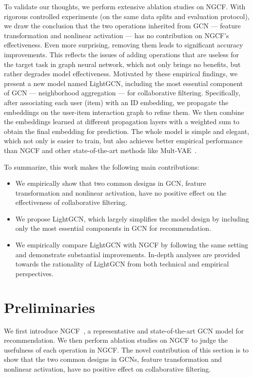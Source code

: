 \documentclass[sigconf]{acmart}
\theoremstyle{definition}
\begin{document}
To validate our thoughts, we perform extensive ablation studies on NGCF. With rigorous controlled experiments (on the same data splits and evaluation protocol), we draw the conclusion that the two operations inherited from GCN --- feature transformation and nonlinear activation --- has no contribution on NGCF's effectiveness. Even more surprising, removing them leads to significant accuracy improvements. This reflects the issues of adding operations that are useless for the target task in graph neural network, which not only brings no benefits, but rather degrades model effectiveness. Motivated by these empirical findings, we present a new model named LightGCN, including the most essential component of GCN --- neighborhood aggregation --- for collaborative filtering. Specifically, after associating each user (item) with an ID embedding, we propagate the embeddings on the user-item interaction graph to refine them. We then combine the embeddings learned at different propagation layers with a weighted sum to obtain the final embedding for prediction. The whole model is simple and elegant, which not only is easier to train, but also achieves better empirical performance than NGCF and other state-of-the-art methods like Mult-VAE~\cite{VACF}. 

To summarize, this work makes the following main contributions:
\begin{itemize}\item We empirically show that two common designs in GCN, feature transformation and nonlinear activation, have no positive effect on the effectiveness of collaborative filtering. 
    \item We propose LightGCN, which largely simplifies the model design by including only the most essential components in GCN for recommendation.
    \item We empirically compare LightGCN with NGCF by following the same setting and demonstrate substantial improvements. In-depth analyses are provided towards the rationality of LightGCN from both technical and empirical perspectives. 
\end{itemize}

%
 \section{Preliminaries}\label{sec:preliminaries}

We first introduce NGCF~\cite{NGCF}, a representative and state-of-the-art GCN model for recommendation. We then perform ablation studies on NGCF to judge the usefulness of each operation in NGCF. The novel contribution of this section is to show that the two common designs in GCNs, feature transformation and nonlinear activation, have no positive effect on collaborative filtering. 
\end{document}

